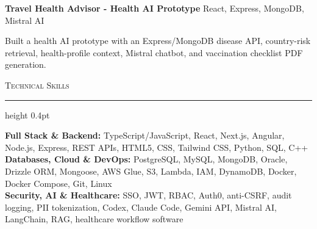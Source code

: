 \documentclass[letterpaper,11pt]{article}
\newcommand{\resumesection}[1]{%
  \par\vspace{2pt}%
  {\large\scshape #1}\par\vspace{2pt}%
  \hrule height 0.4pt\vspace{2pt}%
}
\newcommand{\projectHeading}[2]{
  \textbf{#1} \hfill #2
}
\begin{document}
\projectHeading{Travel Health Advisor - Health AI Prototype}{React, Express, MongoDB, Mistral AI}
\begin{tightitemize}
  \item Built a health AI prototype with an Express/MongoDB disease API, country-risk retrieval, health-profile context, Mistral chatbot, and vaccination checklist PDF generation.
\end{tightitemize}

\resumesection{Technical Skills}
\textbf{Full Stack \& Backend:} TypeScript/JavaScript, React, Next.js, Angular, Node.js, Express, REST APIs, HTML5, CSS, Tailwind CSS, Python, SQL, C++\\
\textbf{Databases, Cloud \& DevOps:} PostgreSQL, MySQL, MongoDB, Oracle, Drizzle ORM, Mongoose, AWS Glue, S3, Lambda, IAM, DynamoDB, Docker, Docker Compose, Git, Linux\\
\textbf{Security, AI \& Healthcare:} SSO, JWT, RBAC, Auth0, anti-CSRF, audit logging, PII tokenization, Codex, Claude Code, Gemini API, Mistral AI, LangChain, RAG, healthcare workflow software
\end{document}
